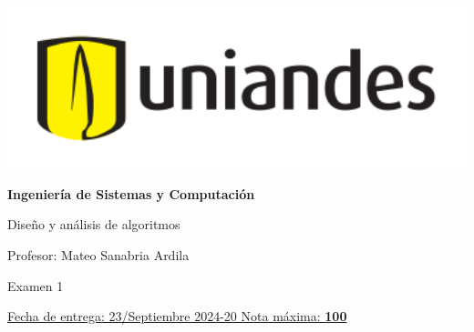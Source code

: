 \documentclass[12pt, a4paper]{exam}
\begin{document}
\noindent
\begin{minipage}[l]{0.1\textwidth}
    \noindent
    \includegraphics[width=1.8\textwidth]{Logosimbolo-uniandes_horizontal.png}
\end{minipage}
\hfill
\begin{minipage}[c]{0.8\textwidth}
    \begin{center}
        {\large \textbf{Ingeniería de Sistemas y Computación} \par
            \large	Diseño y análisis de algoritmos	\par
            \small  Profesor: Mateo Sanabria Ardila	\par
            \small  Examen 1	\par
        }
    \end{center}
\end{minipage}
\par
\vspace{0.2in}
\noindent
\uline{Fecha de entrega: 23/Septiembre 	\hfill  2024-20		\hfill Nota máxima:
\textbf{100} }
\par
\vspace{0.15in}
\end{document}
